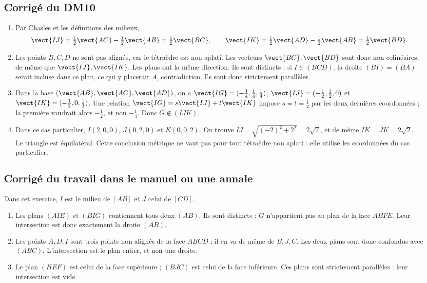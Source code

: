 \subsection{Corrigé du DM10}\begin{enumerate}
\item Par Chasles et les définitions des milieux,
\[\vect{IJ}=\tfrac12\vect{AC}-\tfrac12\vect{AB}=\tfrac12\vect{BC},\qquad \vect{IK}=\tfrac12\vect{AD}-\tfrac12\vect{AB}=\tfrac12\vect{BD}.\]
\item Les points $B,C,D$ ne sont pas alignés, car le tétraèdre est non aplati. Les vecteurs $\vect{BC},\vect{BD}$ sont donc non colinéaires, de même que $\vect{IJ},\vect{IK}$. Les plans ont la même direction. Ils sont distincts : si $I\in(BCD)$, la droite $(BI)=(BA)$ serait incluse dans ce plan, ce qui y placerait $A$, contradiction. Ils sont donc strictement parallèles.
\item Dans la base $(\vect{AB},\vect{AC},\vect{AD})$, on a $\vect{IG}=(-\frac{1}{4},\frac{1}{4},\frac{1}{4})$, $\vect{IJ}=(-\frac{1}{2},\frac{1}{2},0)$ et $\vect{IK}=(-\frac{1}{2},0,\frac{1}{2})$. Une relation $\vect{IG}=s\vect{IJ}+t\vect{IK}$ impose $s=t=\frac{1}{2}$ par les deux dernières coordonnées ; la première vaudrait alors $-\frac{1}{2}$, et non $-\frac{1}{4}$. Donc $G\notin(IJK)$.
\item Dans ce cas particulier, $I(2,0,0)$, $J(0,2,0)$ et $K(0,0,2)$. On trouve $IJ=\sqrt{(-2)^2+2^2}=2\sqrt2$, et de même $IK=JK=2\sqrt2$. Le triangle est équilatéral. Cette conclusion métrique ne vaut pas pour tout tétraèdre non aplati : elle utilise les coordonnées du cas particulier.
\end{enumerate}

\subsection{Corrigé du travail dans le manuel ou une annale}Dans cet exercice, $I$ est le milieu de $[AB]$ et $J$ celui de $[CD]$.
\begin{enumerate}
\item Les plans $(AIE)$ et $(BIG)$ contiennent tous deux $(AB)$. Ils sont distincts : $G$ n'appartient pas au plan de la face $ABFE$. Leur intersection est donc exactement la droite $(AB)$.
\item Les points $A,D,I$ sont trois points non alignés de la face $ABCD$ ; il en va de même de $B,J,C$. Les deux plans sont donc confondus avec $(ABC)$. L'intersection est le plan entier, et non une droite.
\item Le plan $(HEF)$ est celui de la face supérieure ; $(BJC)$ est celui de la face inférieure. Ces plans sont strictement parallèles : leur intersection est vide.
\end{enumerate}

\fi

